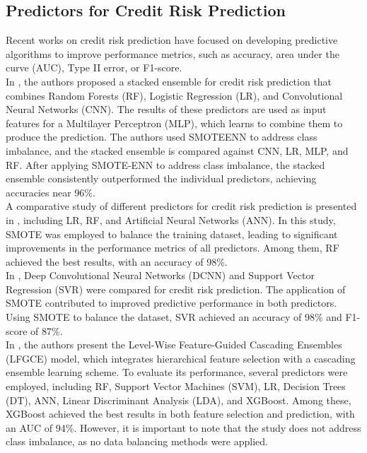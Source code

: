 \subsection{Predictors for Credit Risk Prediction}

    Recent works on credit risk prediction have focused on developing predictive algorithms to improve performance metrics, such as accuracy, area under the curve (AUC), Type II error, or F1-score.\\
    
    In \cite{aruleba2025improved}, the authors proposed a stacked ensemble for credit risk prediction that combines Random Forests (RF), Logistic Regression (LR), and Convolutional Neural Networks (CNN). The results of these predictors are used as input features for a Multilayer Perceptron (MLP), which learns to combine them to produce the prediction. The authors used SMOTEENN \cite{batista2004study} to address class imbalance, and the stacked ensemble is compared against CNN, LR, MLP, and RF. After applying SMOTE-ENN to address class imbalance, the stacked ensemble consistently outperformed the individual predictors, achieving accuracies near 96\%.\\ 
    
    A comparative study of different predictors for credit risk prediction is presented in \cite{sundaravadivel2025optimizing}, including LR, RF, and Artificial Neural Networks (ANN). In this study, SMOTE \cite{chawla2002smote} was employed to balance the training dataset, leading to significant improvements in the performance metrics of all predictors. Among them, RF achieved the best results, with an accuracy of 98\%.\\

    In \cite{kandi2025evaluating}, Deep Convolutional Neural Networks (DCNN) and Support Vector Regression (SVR) were compared for credit risk prediction. The application of SMOTE contributed to improved predictive performance in both predictors. Using SMOTE to balance the dataset, SVR achieved an accuracy of 98\% and F1-score of 87\%.\\
    
    In \cite{zou2025level}, the authors present the Level-Wise Feature-Guided Cascading Ensembles (LFGCE) model, which integrates hierarchical feature selection with a cascading ensemble learning scheme. To evaluate its performance, several predictors were employed, including RF, Support Vector Machines (SVM), LR, Decision Trees (DT), ANN, Linear Discriminant Analysis (LDA), and XGBoost. Among these, XGBoost achieved the best results in both feature selection and prediction, with an AUC of 94\%. However, it is important to note that the study does not address class imbalance, as no data balancing methods were applied.\\ 

